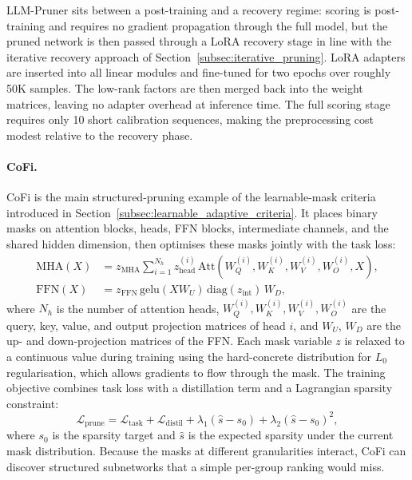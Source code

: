 LLM-Pruner sits between a post-training and a recovery regime: scoring is post-training and requires no gradient propagation through the full model, but the pruned network is then passed through a LoRA recovery stage in line with the iterative recovery approach of Section~\ref{subsec:iterative_pruning}. LoRA adapters \cite{hu2021lora} are inserted into all linear modules and fine-tuned for two epochs over roughly 50K samples. The low-rank factors are then merged back into the weight matrices, leaving no adapter overhead at inference time. The full scoring stage requires only 10 short calibration sequences, making the preprocessing cost modest relative to the recovery phase.

\methodsep

\paragraph{CoFi.}
CoFi \cite{xia2022structured} is the main structured-pruning example of the learnable-mask criteria introduced in Section~\ref{subsec:learnable_adaptive_criteria}. It places binary masks on attention blocks, heads, FFN blocks, intermediate channels, and the shared hidden dimension, then optimises these masks jointly with the task loss:
\begin{align}
	\mathrm{MHA}(X) &= z_{\mathrm{MHA}} \sum_{i=1}^{N_h} z_{\mathrm{head}}^{(i)} \,\mathrm{Att}\!\left(W_Q^{(i)},W_K^{(i)},W_V^{(i)},W_O^{(i)},X\right), \\
	\mathrm{FFN}(X) &= z_{\mathrm{FFN}}\, \mathrm{gelu}(XW_U)\,\mathrm{diag}(z_{\mathrm{int}})\,W_D,
\end{align}
where $N_h$ is the number of attention heads, $W_Q^{(i)}, W_K^{(i)}, W_V^{(i)}, W_O^{(i)}$ are the query, key, value, and output projection matrices of head $i$, and $W_U$, $W_D$ are the up- and down-projection matrices of the FFN. Each mask variable $z$ is relaxed to a continuous value during training using the hard-concrete distribution for $L_0$ regularisation, which allows gradients to flow through the mask. The training objective combines task loss with a distillation term and a Lagrangian sparsity constraint:
\begin{equation}
	\mathcal{L}_{\mathrm{prune}}
	=
	\mathcal{L}_{\mathrm{task}}
	+
	\mathcal{L}_{\mathrm{distil}}
	+
	\lambda_1(\hat s - s_0)
	+
	\lambda_2(\hat s - s_0)^2,
\end{equation}
where $s_0$ is the sparsity target and $\hat{s}$ is the expected sparsity under the current mask distribution. Because the masks at different granularities interact, CoFi can discover structured subnetworks that a simple per-group ranking would miss.

